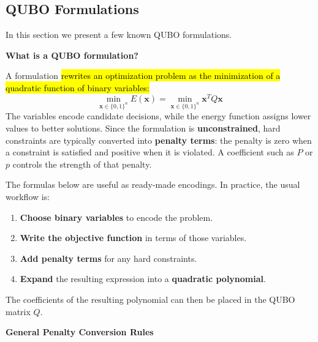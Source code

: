 \subsection{QUBO Formulations}\label{sec:qubo-formulations}

In this section we present a few known QUBO formulations.

\begin{flushleft}
    \textcolor{Green3}{ \textbf{What is a QUBO formulation?}}
\end{flushleft}
A  formulation \hl{rewrites an optimization problem as the minimization of a quadratic function of binary variables:}
\begin{equation*}
    \min_{\mathbf{x}\in\{0,1\}^{n}} E(\mathbf{x})
    =
    \min_{\mathbf{x}\in\{0,1\}^{n}}
    \mathbf{x}^{T}Q\mathbf{x}
\end{equation*}
The variables encode candidate decisions, while the energy function assigns lower
values to better solutions. Since the formulation is \textbf{unconstrained}, hard
constraints are typically converted into \textbf{penalty terms}: the penalty is zero when a constraint is satisfied and positive when it is violated. A coefficient such as $P$ or $p$ controls the strength of that penalty.

\highspace
The formulas below are useful as ready-made encodings. In practice, the usual
workflow is:
\begin{enumerate}
    \item \textbf{Choose binary variables} to encode the problem.
    \item \textbf{Write the objective function} in terms of those variables.
    \item \textbf{Add penalty terms} for any hard constraints.
    \item \textbf{Expand} the resulting expression into a \textbf{quadratic polynomial}.
\end{enumerate}
The coefficients of the resulting polynomial can then be placed in the QUBO
matrix $Q$.

\begin{flushleft}
    \textcolor{Green3}{ \textbf{General Penalty Conversion Rules}}
\end{flushleft}

